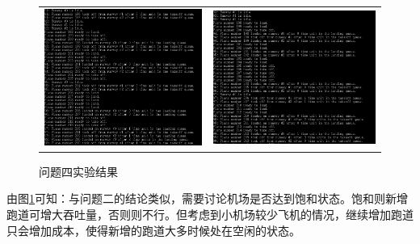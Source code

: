 \documentclass[12pt,UTF8]{ctexart}
\begin{document}
\begin{spacing}{1.4}
\begin{figure}[H]
	\centering
	\begin{tabular}{cc}
	\includegraphics[width=0.5\linewidth]{fig/exp_40.PNG} &
	\includegraphics[width=0.5\linewidth]{fig/exp_41.PNG}
	\end{tabular}
	\caption{问题四实验结果}
	\label{fig:4}
\end{figure}
由图\ref{fig:4}可知：与问题二的结论类似，需要讨论机场是否达到饱和状态。饱和则新增跑道可增大吞吐量，否则则不行。但考虑到小机场较少飞机的情况，继续增加跑道只会增加成本，使得新增的跑道大多时候处在空闲的状态。


\end{spacing}
\end{document}
